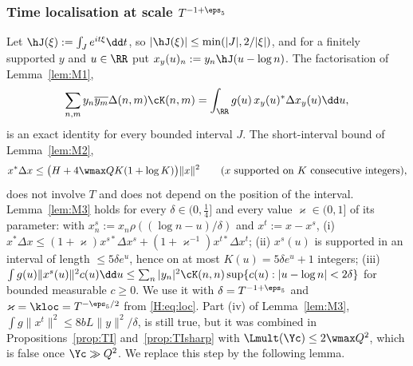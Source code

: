 \subsubsection*{Time localisation at scale \texorpdfstring{$T^{-1+\eps_5}$}{T\^{}(-1+eps5)}}\label{H:sec:loc}
Let $\hJ(\xi):=\int_Je^{it\xi}\dd t$, so $|\hJ(\xi)|\le\min(|J|,2/|\xi|)$, and for a finitely supported $y$ and $u\in\RR$ put $x_y(u)_n:=y_n\hJ(u-\log n)$. The factorisation of Lemma~\ref{lem:M1},
\begin{equation}\label{H:eq:M1}
\sum_{n,m}y_n\overline{y_m}\Delta(n,m)\cK(n,m)=\int_\RR g(u)\,x_y(u)^*\Delta x_y(u)\dd u,
\end{equation}
is an exact identity for every bounded interval $J$. The short-interval bound of Lemma~\ref{lem:M2},
\begin{equation}\label{H:eq:M2}
x^*\Delta x\le\big(H+4\wmax QK(1+\log K)\big)\|x\|^2\qquad(x\text{ supported on }K\text{ consecutive integers}),
\end{equation}
does not involve $T$ and does not depend on the position of the interval. Lemma~\ref{lem:M3} holds for every $\delta\in(0,\frac14]$ and every value $\varkappa\in(0,1]$ of its parameter: with $x^s_n:=x_n\rho((\log n-u)/\delta)$ and $x^t:=x-x^s$, (i) $x^*\Delta x\le(1+\varkappa)x^{s*}\Delta x^s+(1+\varkappa^{-1})x^{t*}\Delta x^t$; (ii) $x^s(u)$ is supported in an interval of length $\le5\delta e^u$, hence on at most $K(u)=5\delta e^u+1$ integers; (iii) $\int g(u)\|x^s(u)\|^2c(u)\dd u\le\sum_n|y_n|^2\cK(n,n)\sup\{c(u):|u-\log n|<2\delta\}$ for bounded measurable $c\ge0$. We use it with $\delta=T^{-1+\eps_5}$ and $\varkappa=\kloc=T^{-\eps_5/2}$ from \eqref{H:eq:loc}. Part (iv) of Lemma~\ref{lem:M3}, $\int g\|x^t\|^2\le8bL\|y\|^2/\delta$, is still true, but it was combined in Propositions~\ref{prop:TI} and~\ref{prop:TIsharp} with $\Lmult(\Yc)\le2\wmax Q^2$, which is false once $\Yc\gg Q^2$. We replace this step by the following lemma.

